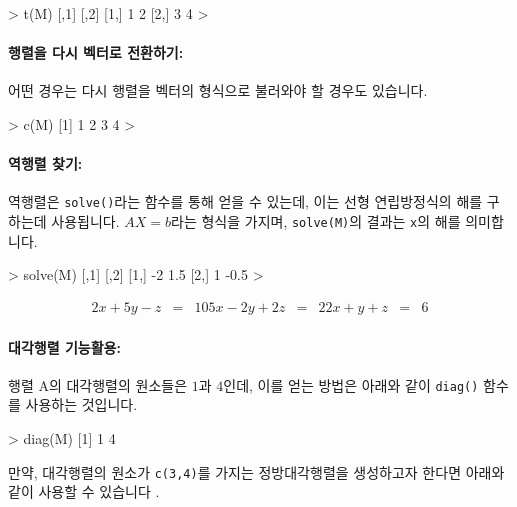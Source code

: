 \documentclass{report}
\begin{document}
\begin{Schunk}
\begin{Soutput}
> t(M)
     [,1] [,2]
[1,]    1    2
[2,]    3    4
> 
\end{Soutput}
\end{Schunk}

\paragraph{행렬을 다시 벡터로 전환하기:}
어떤 경우는 다시 행렬을 벡터의 형식으로 불러와야 할 경우도 있습니다. 

\begin{Schunk}
\begin{Soutput}
> c(M)
[1] 1 2 3 4
> 
\end{Soutput}
\end{Schunk}

\paragraph{역행렬 찾기:} 역행렬은 \texttt{solve()}라는 함수를 통해 얻을 수 있는데, 이는 선형 연립방정식의 해를 구하는데 사용됩니다. 
$AX=b$라는 형식을 가지며, \texttt{solve(M)}의 결과는 \texttt{x}의 해를 의미합니다.

\begin{Schunk}
\begin{Soutput}
> solve(M)
     [,1] [,2]
[1,]   -2  1.5
[2,]    1 -0.5
>
\end{Soutput}
\end{Schunk}

\begin{eqnarray}
2x + 5y - z & = & 10
5x - 2y + 2z & = & 22
x + y + z & = & 6
\end{eqnarray}


\paragraph{대각행렬 기능활용: } 행렬 A의 대각행렬의 원소들은 $1$과 $4$인데, 이를 얻는 방법은 아래와 같이 \texttt{diag()} 함수를 사용하는 것입니다. 

\begin{Schunk}
\begin{Soutput}
> diag(M)
[1] 1 4
\end{Soutput}
\end{Schunk}

만약, 대각행렬의 원소가 \texttt{c(3,4)}를 가지는 정방대각행렬을 생성하고자 한다면 아래와 같이 사용할 수 있습니다 .
\end{document}

